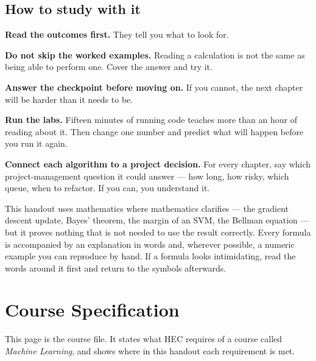 \section*{How to study with it}

\begin{tightnum}
  \item \textbf{Read the outcomes first.} They tell you what to look for.
  \item \textbf{Do not skip the worked examples.} Reading a calculation is not
        the same as being able to perform one. Cover the answer and try it.
  \item \textbf{Answer the checkpoint before moving on.} If you cannot, the
        next chapter will be harder than it needs to be.
  \item \textbf{Run the labs.} Fifteen minutes of running code teaches more
        than an hour of reading about it. Then change one number and predict
        what will happen before you run it again.
  \item \textbf{Connect each algorithm to a project decision.} For every chapter,
        say which project-management question it could answer --- how long, how
        risky, which queue, when to refactor. If you can, you understand it.
\end{tightnum}

\begin{alertbox}
This handout uses mathematics where mathematics clarifies --- the gradient
descent update, Bayes' theorem, the margin of an SVM, the Bellman equation ---
but it proves nothing that is not needed to use the result correctly. Every
formula is accompanied by an explanation in words and, wherever possible, a
numeric example you can reproduce by hand. If a formula looks intimidating, read
the words around it first and return to the symbols afterwards.
\end{alertbox}

\newpage

\chapter*{Course Specification}

This page is the course file. It states what HEC requires of a course called
\emph{Machine Learning}, and shows where in this handout each requirement is
met.

